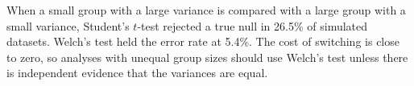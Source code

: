 When a small group with a large variance is compared with a large group with a small variance, Student's $t$-test rejected a true null in 26.5\% of simulated datasets. Welch's test held the error rate at 5.4\%. The cost of switching is close to zero, so analyses with unequal group sizes should use Welch's test unless there is independent evidence that the variances are equal.
